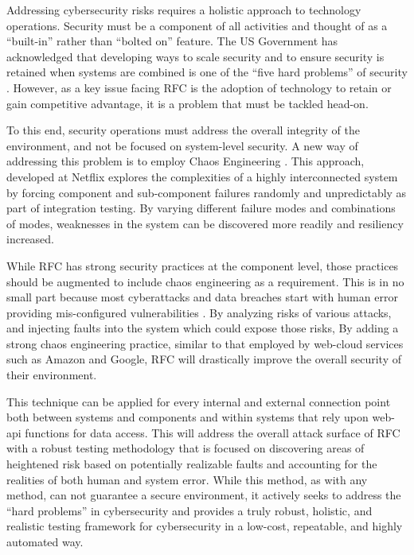Addressing cybersecurity risks requires a holistic approach to technology operations. Security must be a component of all activities and thought of as a ``built-in'' rather than ``bolted on'' feature. The US Government has acknowledged that developing ways to scale security and to ensure security is retained when systems are combined is one of the ``five hard problems'' of security \parencite{scalaRiskFiveHard2019}. However, as a key issue facing RFC is the adoption of technology to retain or gain competitive advantage, it is a problem that must be tackled head-on.

To this end, security operations must address the overall integrity of the environment, and not be focused on system-level security. A new way of addressing this problem is to employ Chaos Engineering \parencite{rosenthalChaosEngineeringSystem2020}. This approach, developed at Netflix explores the complexities of a highly interconnected system by forcing component and sub-component failures randomly and unpredictably as part of integration testing. By varying different failure modes and combinations of modes, weaknesses in the system can be discovered more readily and resiliency increased.

While RFC has strong security practices at the component level, those practices should be augmented to include chaos engineering as a requirement. This is in no small part because most cyberattacks and data breaches start with human error providing mis-configured vulnerabilities \parencite{torkuraCloudStrikeChaosEngineering2020}. By analyzing risks of various attacks, and injecting faults into the system which could expose those risks, By adding a strong chaos engineering practice, similar to that employed by web-cloud services such as Amazon and Google, RFC will drastically improve the overall security of their environment.

This technique can be applied for every internal and external connection point both between systems and components and within systems that rely upon web-api functions for data access. This will address the overall attack surface of RFC with a robust testing methodology that is focused on discovering areas of heightened risk based on potentially realizable faults and accounting for the realities of both human and system error. While this method, as with any method, can not guarantee a secure environment, it actively seeks to address the ``hard problems'' in cybersecurity and provides a truly robust, holistic, and realistic testing framework for cybersecurity in a low-cost, repeatable, and highly automated way.
